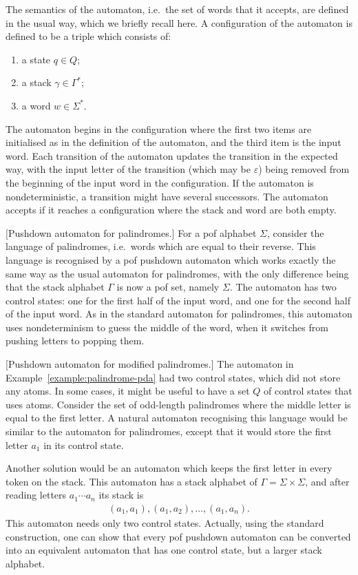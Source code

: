 The semantics of the automaton, i.e.~the set of words that it accepts, are defined in the usual way, which we briefly recall here.
A configuration of the automaton is defined to be a  triple which consists of: 
\begin{enumerate}
	\item a state $q \in Q$;
	\item a stack $\gamma \in \Gamma^*$;
	\item a word $w \in \Sigma^*$.
\end{enumerate}
The automaton begins in the configuration  where the first two items are initialised as  in the definition of the automaton, and the third item is the  input word. Each transition of the automaton updates the transition in the expected way, with the input letter of the transition (which may be $\varepsilon$) being removed from the beginning of the input word in the configuration. If the automaton is nondeterministic, a transition might have several successors. The automaton accepts if it reaches a configuration where the stack and  word are both empty.

\begin{myexample}\label{example:palindrome-pda}[Pushdown automaton for palindromes.]
	For a pof alphabet $\Sigma$, consider the language of palindromes, i.e.~words which are equal to their reverse.
	This language is recognised by a pof pushdown automaton which works exactly the same way as the usual automaton for palindromes, with the only difference being that the stack alphabet $\Gamma$ is now a pof  set, namely  $\Sigma$. The automaton has two control states: one for the first half of the input word, and one for the second half of the input  word. As in the standard automaton for palindromes, this automaton uses nondeterminism to guess the middle of the word, when it switches from pushing letters to popping them.
	\end{myexample}

	\begin{myexample}\label{example:mid-palindrome-pda}[Pushdown automaton for modified palindromes.]
		The automaton in Example~\ref{example:palindrome-pda} had two control states, which did not store any atoms. In some cases, it might be useful to have a set $Q$ of control states that uses atoms. Consider  the set of odd-length palindromes where the middle letter is equal to the first letter. 
		A natural automaton  recognising this language would be similar to the automaton for palindromes, except that it would store the first letter $a_1$ in its control state. 
		
		Another solution would be an automaton which keeps the first letter in every token on the stack. This automaton has a stack alphabet of $\Gamma = \Sigma \times \Sigma$, and after reading letters $a_1 \cdots a_n$ its stack is
		\begin{align*}
			(a_1,a_1),(a_1,a_2),\ldots,(a_1,a_n).
		\end{align*}
		This automaton needs only two control states. Actually, using the standard construction, one can show that every pof pushdown automaton  can be converted into an equivalent automaton that has one control state, but a larger stack alphabet.
	\end{myexample}
	
